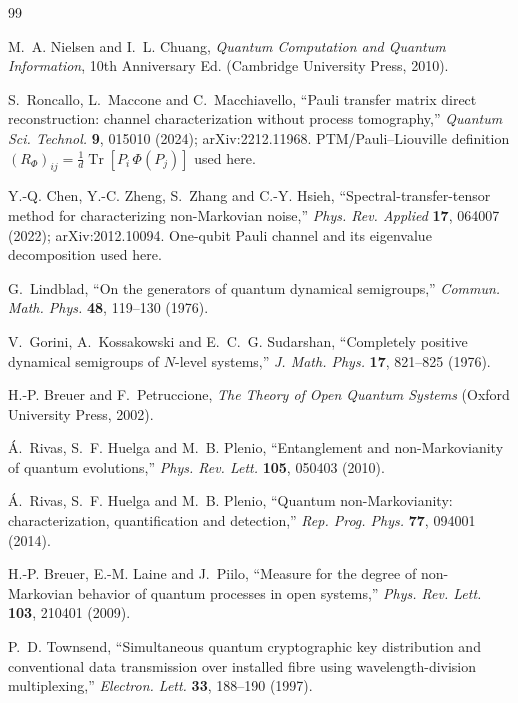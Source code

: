 \documentclass[11pt]{article}
\newcommand{\Tr}{\operatorname{Tr}}
\begin{document}
\begin{thebibliography}{99}
\setlength{\itemsep}{2pt}

 M.~A. Nielsen and I.~L. Chuang,
\emph{Quantum Computation and Quantum Information}, 10th Anniversary Ed.
(Cambridge University Press, 2010).

 S.~Roncallo, L.~Maccone and C.~Macchiavello,
``Pauli transfer matrix direct reconstruction: channel characterization without process
tomography,'' \emph{Quantum Sci. Technol.} \textbf{9}, 015010 (2024); arXiv:2212.11968.
PTM/Pauli--Liouville definition $(R_\Phi)_{ij}=\tfrac{1}{d}\Tr[P_i\,\Phi(P_j)]$ used here.

 Y.-Q. Chen, Y.-C. Zheng, S.~Zhang and C.-Y. Hsieh,
``Spectral-transfer-tensor method for characterizing non-Markovian noise,''
\emph{Phys. Rev. Applied} \textbf{17}, 064007 (2022); arXiv:2012.10094.
One-qubit Pauli channel and its eigenvalue decomposition used here.

 G.~Lindblad, ``On the generators of quantum dynamical semigroups,''
\emph{Commun. Math. Phys.} \textbf{48}, 119--130 (1976).

 V.~Gorini, A.~Kossakowski and E.~C.~G. Sudarshan,
``Completely positive dynamical semigroups of $N$-level systems,''
\emph{J. Math. Phys.} \textbf{17}, 821--825 (1976).

 H.-P. Breuer and F.~Petruccione,
\emph{The Theory of Open Quantum Systems} (Oxford University Press, 2002).

 \'A.~Rivas, S.~F. Huelga and M.~B. Plenio,
``Entanglement and non-Markovianity of quantum evolutions,''
\emph{Phys. Rev. Lett.} \textbf{105}, 050403 (2010).

 \'A.~Rivas, S.~F. Huelga and M.~B. Plenio,
``Quantum non-Markovianity: characterization, quantification and detection,''
\emph{Rep. Prog. Phys.} \textbf{77}, 094001 (2014).

 H.-P. Breuer, E.-M. Laine and J.~Piilo,
``Measure for the degree of non-Markovian behavior of quantum processes in open systems,''
\emph{Phys. Rev. Lett.} \textbf{103}, 210401 (2009).

 P.~D. Townsend,
``Simultaneous quantum cryptographic key distribution and conventional data transmission over
installed fibre using wavelength-division multiplexing,''
\emph{Electron. Lett.} \textbf{33}, 188--190 (1997).


\end{thebibliography}
\end{document}
